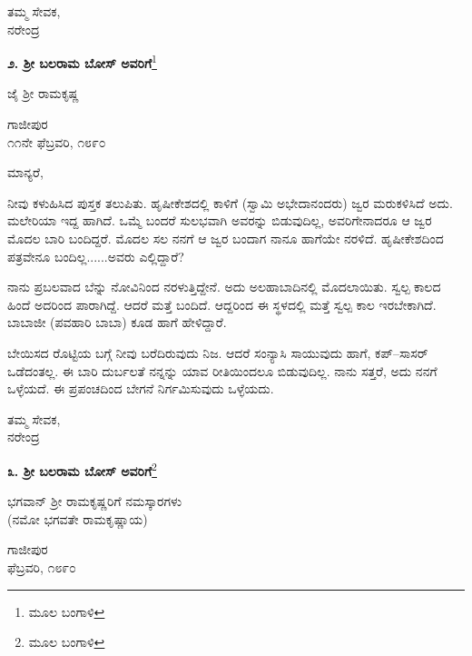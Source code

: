 \begin{flushright}
ತಮ್ಮ ಸೇವಕ,\\ನರೇಂದ್ರ
\end{flushright}

\begin{center}
\textbf{೨. ಶ‍್ರೀ ಬಲರಾಮ ಬೋಸ್ ಅವರಿಗೆ}\footnote{ಮೂಲ ಬಂಗಾಳಿ}
\end{center}

\begin{center}
ಜೈ ಶ‍್ರೀ ರಾಮಕೃಷ್ಣ
\end{center}

\begin{flushright}
ಗಾಜೀಪುರ\\೧೧ನೇ ಫೆಬ್ರವರಿ, ೧೮೯೦
\end{flushright}

ಮಾನ್ಯರೆ,

ನೀವು ಕಳುಹಿಸಿದ ಪುಸ್ತಕ ತಲುಪಿತು. ಹೃಷೀಕೇಶದಲ್ಲಿ ಕಾಳಿಗೆ  (ಸ್ವಾಮಿ ಅಭೇದಾನಂದರು) ಜ್ವರ ಮರುಕಳಿಸಿದೆ ಅದು. ಮಲೇರಿಯಾ ಇದ್ದ ಹಾಗಿದೆ. ಒಮ್ಮೆ ಬಂದರೆ ಸುಲಭವಾಗಿ ಅವರನ್ನು ಬಿಡುವುದಿಲ್ಲ, ಅವರಿಗೇನಾದರೂ ಆ ಜ್ವರ ಮೊದಲ ಬಾರಿ ಬಂದಿದ್ದರೆ. ಮೊದಲ ಸಲ ನನಗೆ ಆ ಜ್ವರ ಬಂದಾಗ ನಾನೂ ಹಾಗೆಯೇ ನರಳಿದೆ. ಹೃಷೀಕೇಶದಿಂದ ಪತ್ರವೇನೂ ಬಂದಿಲ್ಲ......ಅವರು ಎಲ್ಲಿದ್ದಾರೆ?

ನಾನು ಪ್ರಬಲವಾದ ಬೆನ್ನು ನೋವಿನಿಂದ ನರಳುತ್ತಿದ್ದೇನೆ. ಅದು ಅಲಹಾಬಾದಿನಲ್ಲಿ ಮೊದಲಾಯಿತು. ಸ್ವಲ್ಪ ಕಾಲದ ಹಿಂದೆ ಅದರಿಂದ ಪಾರಾಗಿದ್ದೆ. ಆದರೆ ಮತ್ತೆ ಬಂದಿದೆ. ಆದ್ದರಿಂದ ಈ ಸ್ಥಳದಲ್ಲಿ ಮತ್ತೆ ಸ್ವಲ್ಪ ಕಾಲ ಇರಬೇಕಾಗಿದೆ. ಬಾಬಾಜೀ (ಪವಹಾರಿ ಬಾಬಾ) ಕೂಡ ಹಾಗೆ ಹೇಳಿದ್ದಾರೆ.

ಬೇಯಿಸದ ರೊಟ್ಟಿಯ ಬಗ್ಗೆ ನೀವು ಬರೆದಿರುವುದು ನಿಜ. ಆದರೆ ಸಂನ್ಯಾಸಿ ಸಾಯುವುದು ಹಾಗೆ, ಕಪ್–ಸಾಸರ್ ಒಡೆದಂತಲ್ಲ. ಈ ಬಾರಿ ದುರ್ಬಲತೆ ನನ್ನನ್ನು ಯಾವ ರೀತಿಯಿಂದಲೂ ಬಿಡುವುದಿಲ್ಲ. ನಾನು ಸತ್ತರೆ, ಅದು ನನಗೆ ಒಳ್ಳೆಯದೆ. ಈ ಪ್ರಪಂಚದಿಂದ ಬೇಗನೆ ನಿರ್ಗಮಿಸುವುದು ಒಳ್ಳೆಯದು.

\begin{flushright}
ತಮ್ಮ ಸೇವಕ,\\ನರೇಂದ್ರ
\end{flushright}

\newpage

\begin{center}
\textbf{೩. ಶ‍್ರೀ ಬಲರಾಮ ಬೋಸ್ ಅವರಿಗೆ}\footnote{ಮೂಲ ಬಂಗಾಳಿ}
\end{center}

\begin{center}
ಭಗವಾನ್ ಶ‍್ರೀ ರಾಮಕೃಷ್ಣರಿಗೆ ನಮಸ್ಕಾರಗಳು\\(ನಮೋ ಭಗವತೇ ರಾಮಕೃಷ್ಣಾಯ)
\end{center}

\begin{flushright}
ಗಾಜೀಪುರ\\ಫೆಬ್ರವರಿ, ೧೮೯೦
\end{flushright}

